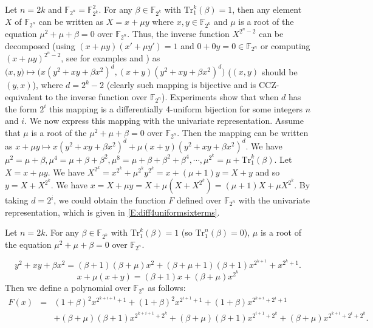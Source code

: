 \documentclass[8pt,oneside]{article}
\newcommand{\0}{\textbf{0}}
\newcommand{\1}{\textbf{1}}
\newcommand{\F}{\mathbb{F}}
\begin{document}
    Let $n=2k$ and $\F_{2^n}=\F_{2^k}^2$. For any $\beta\in\F_{2^k}$ with $\mathrm{Tr}_1^k(\beta)=1$,
    then any element $X$ of $\F_{2^n}$ can be written as $X=x+\mu y$ where $x,y\in\F_{2^k}$ and $\mu$ is a root of the equation
    $\mu^2+\mu+\beta=0$ over $\F_{2^n}$. Thus, the inverse function $X^{2^n-2}$ can be decomposed
    (using $(x+\mu y)(x'+\mu y')=1$ and $0+0y=0\in\F_{2^n}$ or computing $(x+\mu y)^{2^n-2}$, see for examples \cite{Dumas2014arXiv} and \cite[Theorem 5]{PerrinUBCRYPTO16}) as
    $\big(x,y\big)\mapsto \big(x(y^2+xy+\beta x^2)^{d}, (x+y)(y^2+xy+\beta x^2)^{d}\big)$ ($(x,y)$ should be $(y,x)$),
    where $d={2^k-2}$ (clearly such mapping is bijective and is CCZ-equivalent to the inverse function over $\F_{2^n}$).
    Experiments show that when $d$ has the form $2^i$ this mapping is a differentially 4-uniform bijection
    for some integers $n$ and $i$. We now express this mapping with the univariate representation.
    Assume that $\mu$ is a root of the $\mu^2+\mu+\beta=0$ over $\F_{2^n}$.
    Then the mapping 
    can be written as $x+\mu y\mapsto x(y^2+xy+\beta x^2)^{d}+\mu(x+y)(y^2+xy+\beta x^2)^{d}$.
    We have $\mu^2=\mu+\beta,\mu^4=\mu+\beta+\beta^2,\mu^8=\mu+\beta+\beta^2+\beta^4,\cdots,\mu^{2^k}=\mu+\mathrm{Tr}_1^k(\beta)$.
    Let $X=x+\mu y$. We have $X^{2^k}=x^{2^k}+\mu^{2^k}y^{2^k}=x+(\mu+1)y=X+y$ and so $y=X+X^{2^k}$.
    We have $x=X+\mu y=X+\mu(X+X^{2^k})=(\mu+1)X+\mu X^{2^k}$. By taking $d=2^i$, we could obtain the
    function $F$ defined over $\F_{2^n}$ with the univariate representation, which is given in \eqref{E:diff4uniformsixterms}.
    
    
    Let $n=2k$.
    For any $\beta\in\F_{2^k}$ with $\mathrm{Tr}_1^k(\beta)=1$ (so $\mathrm{Tr}_1^n(\beta)=0$),
    $\mu$ is a root of the equation $\mu^2+\mu+\beta=0$ over $\F_{2^n}$.

    \[y^2+xy+\beta x^2=(\beta+1)(\beta+\mu)x^2+(\beta+\mu+1)(\beta+1)x^{2^{k+1}}+x^{2^k+1}.\]
    \[x+\mu(x+y)=(\beta+1)x+(\beta+\mu)x^{2^k}\]
    Then we define a polynomial over $\F_{2^n}$ as follows:
    \begin{eqnarray}\label{E:diff4uniformsixterms}
    F(x)&=&(1+\beta)^2 x^{2^{k+i+1}+1}+(1+\beta)^2 x^{2^{i+1}+1}+(1+\beta) x^{2^{k+i}+2^i+1}\\
    &&+(\beta+\mu)(\beta+1) x^{2^{k+i+1}+2^k}+(\beta+\mu)(\beta+1) x^{2^{i+1}+2^k}+(\beta+\mu) x^{2^{k+i}+2^i+2^k}\nonumber.
    \end{eqnarray}
    
\end{document}
